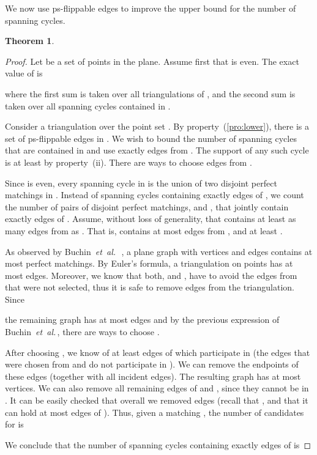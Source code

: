 \documentclass[11pt]{article}
\newtheorem{theorem}{Theorem}
\def\etal{{\it et~al.}\,}
\begin{document}
We now use ps-flippable edges to improve the upper bound for the
number of spanning cycles.
\begin{theorem}\label{thm:polygonize}\label{th:triVSsc}

\end{theorem}
\begin{proof}
Let  be a set of  points in the plane. Assume first that  is even.
The exact value of  is

where the first sum is taken over all triangulations of , and the second sum is
taken over all spanning cycles contained in .

Consider a triangulation  over the point set . By property~(\ref{pro:lower}),
there is a set  of  ps-flippable edges in . We wish to bound the number
of spanning cycles that are contained in  and use exactly  edges from .
The support of any such cycle is at least  by property~(ii).
There are  ways to choose  edges from .

Since  is even, every spanning cycle in  is the union of two
disjoint perfect matchings in . Instead of spanning cycles containing
exactly  edges of , we count the number of pairs of disjoint
perfect matchings,  and , that jointly contain exactly  edges of
. Assume, without loss of generality, that  contains at least as
many edges from  as .
That is,  contains at most  edges from , and  at least .

As observed by Buchin~\etal~\cite{BKK+07}, a plane graph with 
vertices and  edges contains at most  perfect
matchings. By Euler's formula,
a triangulation on  points has at most  edges.
Moreover, we know that both,  and , have to avoid the 
edges from  that were not selected, thus it is safe to remove
 edges from the triangulation. Since

the remaining graph has at most 
edges and by the previous expression of Buchin~\etal, there are
 ways to choose .

After choosing , we know of at least  edges of  which
participate in  (the edges that were chosen from  and do not participate in ).
We can remove the endpoints of these edges (together with all
incident edges). The resulting graph has at most  vertices. We can also remove
all remaining edges of  and , since they cannot be in . It can be easily
checked that overall we removed  edges (recall that ,
and that it can hold at most  edges of ). Thus, given a
matching , the number of candidates for  is


We conclude that the number of spanning cycles containing exactly 
edges of  is



\end{proof}
\end{document}
